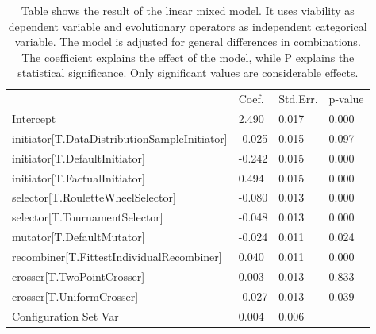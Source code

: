 \documentclass[./../../paper.tex]{subfiles}
\begin{document}
\begin{table}[htbp]
    \caption{Table shows the result of the linear mixed model. It uses viability as dependent variable and evolutionary operators as independent categorical variable. The model is adjusted for general differences in combinations. The coefficient explains the effect of the model, while P explains the statistical significance. Only significant values are considerable effects.}
    \label{tbl:configs_viability}
    \begin{tabular}{llll}
                                                     & Coef.  & Std.Err. & p-value \\
        Intercept                                    & 2.490  & 0.017    & 0.000   \\
        initiator[T.DataDistributionSampleInitiator] & -0.025 & 0.015    & 0.097   \\
        initiator[T.DefaultInitiator]                & -0.242 & 0.015    & 0.000   \\
        initiator[T.FactualInitiator]                & 0.494  & 0.015    & 0.000   \\
        selector[T.RouletteWheelSelector]            & -0.080 & 0.013    & 0.000   \\
        selector[T.TournamentSelector]               & -0.048 & 0.013    & 0.000   \\
        mutator[T.DefaultMutator]                    & -0.024 & 0.011    & 0.024   \\
        recombiner[T.FittestIndividualRecombiner]    & 0.040  & 0.011    & 0.000   \\
        crosser[T.TwoPointCrosser]                   & 0.003  & 0.013    & 0.833   \\
        crosser[T.UniformCrosser]                    & -0.027 & 0.013    & 0.039   \\
        Configuration Set Var                        & 0.004  & 0.006    &         \\
    \end{tabular}
\end{table}
\end{document}
